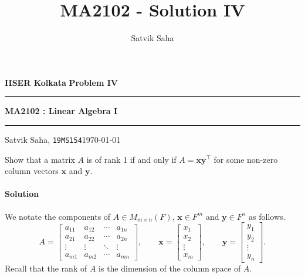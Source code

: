 \documentclass[10pt]{article}
\title{MA2102 - Solution IV}
\author{Satvik Saha}
\date{}
\def\x{\bm{x}}
\def\y{\bm{y}}
\def\xcol{\begin{bmatrix} x_1 \\ x_2 \\ \vdots \\ x_m \end{bmatrix} }
\def\ycol{\begin{bmatrix} y_1 \\ y_2 \\ \vdots \\ y_n \end{bmatrix} }
\begin{document}
        \par\textbf{IISER Kolkata} \hfill \textbf{Problem IV}
        \vspace{3pt}
        \hrule
        \vspace{3pt}
        \begin{center}
                \LARGE{\textbf{MA2102 : Linear Algebra I}}
        \end{center}
        \vspace{3pt}
        \hrule
        \vspace{3pt}
        Satvik Saha, \texttt{19MS154}\hfill\today
        \vspace{20pt}

        Show that a matrix $A$ is of rank 1 if and only if $A = \x\y^\top$ for some non-zero column vectors $\x$ and $\y$.

        \paragraph{Solution}
        We notate the components of $A \in M_{m \times n}(F)$, $\x \in F^m$ and $\y \in F^n$ as follows.
        \[
                A = \begin{bmatrix}
                        a_{11} & a_{12} & \cdots & a_{1n} \\
                        a_{21} & a_{22} & \cdots & a_{2n} \\
                        \vdots & \vdots & \ddots & \vdots \\
                        a_{m1} & a_{m2} & \cdots & a_{mn}
                \end{bmatrix}, \qquad
                \x = \xcol, \qquad
                \y = \ycol.
        \]
        Recall that the rank of $A$ is the dimension of the column space of $A$. \\
\end{document}
